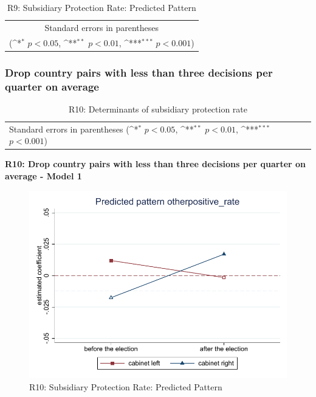 \documentclass[10pt,a4paper]{scrartcl}
\begin{document}
\begin{table}[!ht]\centering
	\footnotesize
	\renewcommand{\arraystretch}{1.2}
	\def\sym#1{\ifmmode^{#1}\else\(^{#1}\)\fi}
	\caption{R9: Subsidiary Protection Rate: Predicted Pattern}
	\begin{tabular}{l*{2}{c}}
		\hline\hline
		
		\hline\hline
		\multicolumn{3}{c}{\footnotesize Standard errors in parentheses} \\
		\multicolumn{3}{c}{\footnotesize (\sym{*} \(p<0.05\), \sym{**} \(p<0.01\), \sym{***} \(p<0.001\))} \\
	\end{tabular}
\end{table}





\clearpage
\FloatBarrier
\subsubsection{Drop country pairs with less than three decisions per quarter on average}
\begin{table}[!ht]\centering
	\renewcommand{\arraystretch}{1.25}
	\small
	\def\sym#1{\ifmmode^{#1}\else\(^{#1}\)\fi}
	\caption{R10: Determinants of subsidiary protection rate}
	\begin{tabular}{l*{3}{c}}
		\hline\hline
		
		\hline\hline
		\multicolumn{4}{l}{\footnotesize Standard errors in parentheses (\sym{*} \(p<0.05\), \sym{**} \(p<0.01\), \sym{***} \(p<0.001\))}\\
	\end{tabular}
\end{table}

\clearpage
\textbf{R10: Drop country pairs with less than three decisions per quarter on average - Model 1}
\begin{figure}[!ht]
	\centering
	\includegraphics[width=1\textwidth]{figures_edited/otherpositive_rate_graph1_R10.pdf}
	\caption{R10: Subsidiary Protection Rate: Predicted Pattern}
\end{figure}
\end{document}
